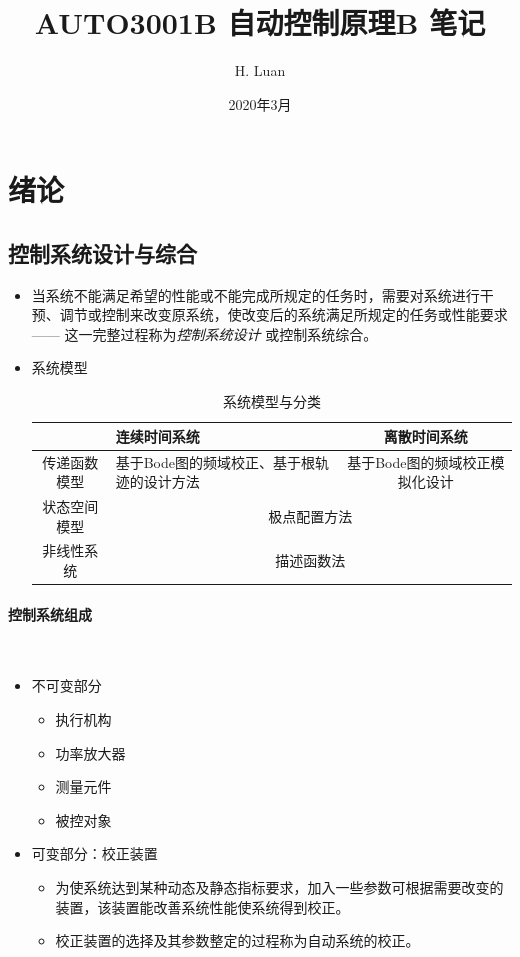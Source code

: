 \documentclass[14pt,a4paper]{article}
\title{AUTO3001B 自动控制原理B 笔记}
\author{H. Luan}
\date{2020年3月}
\theoremstyle{plain}
\theoremstyle{definition}
\theoremstyle{remark}
\theoremstyle{plain}
\theoremstyle{plain}
\theoremstyle{plain}
\theoremstyle{definition}
\theoremstyle{remark}
\numberwithin{equation}{section}
\begin{document}
	\maketitle
	\newpage
	\tableofcontents %
	\newpage

	\setcounter{section}{-1}
	\section{绪论}
	\label{sec:绪论}

		\subsection{控制系统设计与综合}%
		\label{sub:控制系统设计与综合}
		
			
			\begin{itemize}
				\item 当系统不能满足希望的性能或不能完成所规定的任务时，需要对系统进行干预、调节或控制来改变原系统，使改变后的系统满足所规定的任务或性能要求 ------  这一完整过程称为\emph{控制系统设计} 或控制系统综合。 
				\item 系统模型
					\begin{table}[h]
						\centering
						\begin{tabular}{c|p{90pt}|c}
							 & 连续时间系统 & 离散时间系统 \\
							 \hline
							传递函数模型 & 基于Bode图的频域校正、基于根轨迹的设计方法 & 基于Bode图的频域校正模拟化设计\\
							\hline 
							状态空间模型 & \multicolumn{2}{c}{极点配置方法} \\
							\hline
							非线性系统 &\multicolumn{2}{c}{描述函数法} \\
						\end{tabular}
						\caption{系统模型与分类}
					\end{table}
			\end{itemize}

			\paragraph{控制系统组成}%
			\label{par:控制系统组成}
			
				\ 
				\begin{itemize}
					\item 不可变部分
						\begin{itemize}
							\item 执行机构
							\item 功率放大器
							\item 测量元件
							\item 被控对象
						\end{itemize}
					\item 可变部分：校正装置
						\begin{itemize}
							\item 为使系统达到某种动态及静态指标要求，加入一些参数可根据需要改变的装置，该装置能改善系统性能使系统得到校正。
							\item 校正装置的选择及其参数整定的过程称为自动系统的校正。
						\end{itemize}

				\end{itemize}
\end{document}

